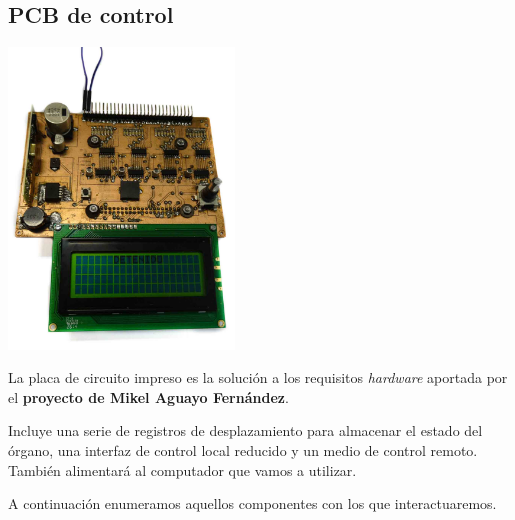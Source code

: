 \documentclass[10pt,a4paper]{article}
\begin{document}
	\subsection{PCB de control}
	
	\begin{multicols}{2}
		\noindent
		\begin{center}
			\includegraphics[width=0.45\textwidth]{images/pcb} 
		\end{center}
		\columnbreak
		La placa de circuito impreso es la solución a los requisitos \textit{hardware} aportada por el \textbf{proyecto de Mikel Aguayo Fernández}. 
		
		Incluye una serie de registros de desplazamiento para almacenar el estado del órgano, una interfaz de control local reducido y un medio de control remoto. También alimentará al computador que vamos a utilizar. 
		
		A continuación enumeramos aquellos componentes con los que interactuaremos.		 
	\end{multicols}	
	
\end{document}
